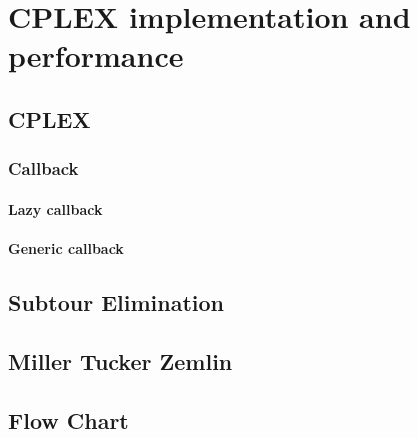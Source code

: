 \chapter{CPLEX implementation and performance}

\section{CPLEX}
\subsection{Callback}
\subsubsection{Lazy callback}
\subsubsection{Generic callback}

\section{Subtour Elimination}\label{sec:subtour}

\section{Miller Tucker Zemlin}

\section{Flow Chart}
